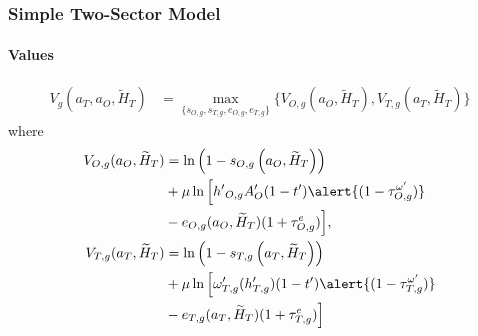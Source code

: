 \documentclass[11pt]{beamer}
\begin{document}
\begin{frame}
\begin{itemize}
\begin{align*}
	\end{align*}
\end{itemize}

\end{frame}
	
	
	\begin{frame}
		\frametitle{Simple Two-Sector Model}
		\framesubtitle{Values}
        \label{valuefn}
		\begin{align*}
			\label{}
			V_g(a_T,a_O,\widetilde{H}_T) & = \max_{\{s_{O,g},s_{T,g},e_{O,g},e_{T,g}\}} \bigg\{ V_{O,g}(a_O,\widetilde{H}_T), V_{T,g}(a_T,\widetilde{H}_T) \bigg\} \label{eq:V}
		\end{align*}
		where
		\begin{align*}
			V_{O,g}(a_O,\widetilde{H}_T) & = \ln\left(1-s_{O,g}\left(a_O,\widetilde{H}_T\right)\right) \nonumber \\
			& + \mu \ln \Big[ {{h'}_{O,g}} A_O'(1-t')\alert{(1-\tau^{\omega '}_{O,g})} \nonumber \\
			& - e_{O,g}(a_O,\widetilde{H}_T)(1+\tau^e_{O,g}) \Big],\\
			V_{T,g}(a_T,\widetilde{H}_T) & = \ln\left(1-s_{T,g}\left(a_T,\widetilde{H}_T\right)\right) \nonumber \\
			& + \mu \ln \Big[ \omega_{T,g}'({h_{T,g}'})(1-t')\alert{(1-\tau^{\omega '}_{T,g}) }\nonumber \\
			& - e_{T,g}(a_T,\widetilde{H}_T)(1+\tau^{e }_{T,g}) \Big] 
		\end{align*}
    \hyperlink{thresh}{}  \hyperlink{lom}{}
	\end{frame}	
\end{document}
